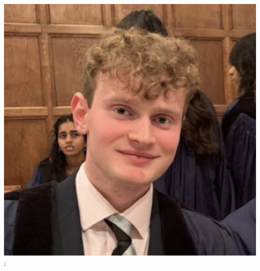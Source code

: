 \documentclass[aspectratio=169]{beamer}
\begin{document}
\begin{frame}
{        \includegraphics[width=0.09\textheight]{people/will_templeton.jpg}%
    };
\end{frame}
\end{document}
